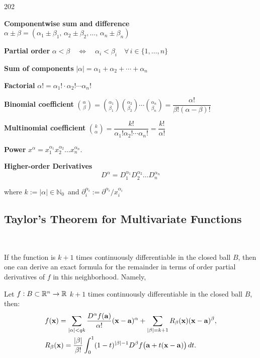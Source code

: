 \begin{dingautolist}{202}

\item \textbf{Componentwise sum and difference}
\(\alpha \pm \beta= (\alpha_1 \pm \beta_1,\,\alpha_2 \pm \beta_2, \ldots, 
\,\alpha_n \pm \beta_n)\)

\item \textbf{Partial order}
\(\alpha < \beta \quad \Leftrightarrow \quad \alpha_i < \beta_i \quad 
\forall\,i\in\{1,\ldots,n\}\)

\item \textbf{Sum of components}
\(| \alpha | = \alpha_1 + \alpha_2 + \cdots + \alpha_n\)

\item \textbf{Factorial}
\(\alpha ! = \alpha_1! \cdot \alpha_2! \cdots \alpha_n!\)

\item \textbf{Binomial coefficient}
\(\displaystyle\binom{\alpha}{\beta} = 
\displaystyle\binom{\alpha_1}{\beta_1}\displaystyle\binom{\alpha_2}{\beta_2}\cdots\displaystyle\binom{\alpha_n}{\beta_n
} = \dfrac{\alpha!}{\beta!(\alpha-\beta)!}\)

\item \textbf{Multinomial coefficient}
\(\displaystyle\binom{k}{\alpha} = \dfrac{k!}{\alpha_1! \alpha_2! \cdots \alpha_n! } = 
\dfrac{k!}{\alpha!}\)

\item \textbf{Power}
\(x^\alpha = x_1^{\alpha_1} x_2^{\alpha_2} \ldots x_n^{\alpha_n}\).

\item \textbf{Higher-order Derivatives} \[D^\alpha = D_1^{\alpha_1} 
D_2^{\alpha_2} \ldots D_n^{\alpha_n}\]

\end{dingautolist}
where \(k:=|\alpha|\in\mathbb{N}_0\,\!\) and 
\(\partial_i^{\alpha_i}:=\partial^{\alpha_i} / x_i^{\alpha_i}\)

\subsection{Taylor's Theorem for Multivariate
Functions}\

If the function is $k+1$ times
continuously differentiable in the
closed ball $B$, then one can derive an exact
formula for the remainder in terms of order
partial derivatives of $f$ in this
neighborhood. Namely,

\begin{thm}  Let $f: B\subset \mathbb{R}^n \to 
\mathbb{R}$ $k+1$ times
continuously differentiable in the
closed ball $B$, then:
\begin{align}& f( \mathbf{ x} ) = \displaystyle\sum_{|\alpha|<q k} \dfrac{D^\alpha 
f(\mathbf{ a})}{\alpha!}
(\mathbf{ x}-\mathbf{ a})^\alpha  + \displaystyle\sum_{|\beta|=k+1} 
R_\beta(\mathbf{ x})(\mathbf{ x}-\mathbf{ a})^\beta, \\&
R_\beta( \mathbf{ x} ) = \dfrac{|\beta|}{\beta!} \displaystyle\int_0^1 (1-t)^{|\beta|-1}D^\beta 
f \big(\mathbf{ a}+t( \mathbf{ x}-
\mathbf{ a} )\big) \, dt. \end{align}

\end{thm}

